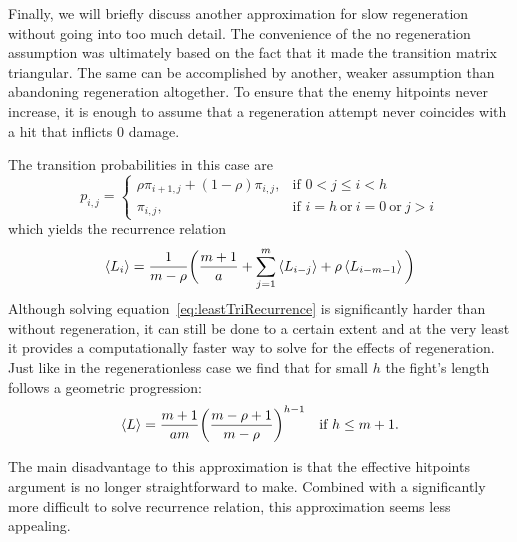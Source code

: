 Finally, we will briefly discuss another approximation for slow regeneration without going into too much detail. The convenience of the no regeneration assumption was ultimately based on the fact that it made the transition matrix triangular. The same can be accomplished by another, weaker assumption than abandoning regeneration altogether. To ensure that the enemy hitpoints never increase, it is enough to assume that a regeneration attempt never coincides with a hit that inflicts 0 damage.

The transition probabilities in this case are
\begin{equation}
	p_{i,j} = \begin{cases}
		\rho\pi_{i+1,j} + (1-\rho)\pi_{i,j},&\mbox{if } 0<j\leq i<h\\
		\pi_{i,j},&\mbox{if } i=h\ \mbox{or}\ i=0\ \mbox{or}\ j>i
	\end{cases}\label{eq:leastTriProbabilities}
\end{equation}
which yields the recurrence relation
\begin{equation}
	\left\langle L_i \right\rangle = \frac{1}{m-\rho}\bigg(\frac{m+1}{a} + \sum_{j=1}^m \left\langle L_{i-j} \right\rangle + \rho\left\langle L_{i-m-1} \right\rangle\bigg)\label{eq:leastTriRecurrence}
\end{equation}
Although solving equation~\ref{eq:leastTriRecurrence} is significantly harder than without regeneration, it can still be done to a certain extent and at the very least it provides a computationally faster way to solve for the effects of regeneration. Just like in the regenerationless case we find that for small $h$ the fight's length follows a geometric progression:
\begin{equation}
	\left\langle L \right\rangle
		= \frac{m+1}{am}{\left(\frac{m-\rho+1}{m-\rho}\right)}^{h-1} \quad \mbox{if }h \leq m+1.
	\label{eq:leastTriGeomL}
\end{equation}

The main disadvantage to this approximation is that the effective hitpoints argument is no longer straightforward to make. Combined with a significantly more difficult to solve recurrence relation, this approximation seems less appealing.
